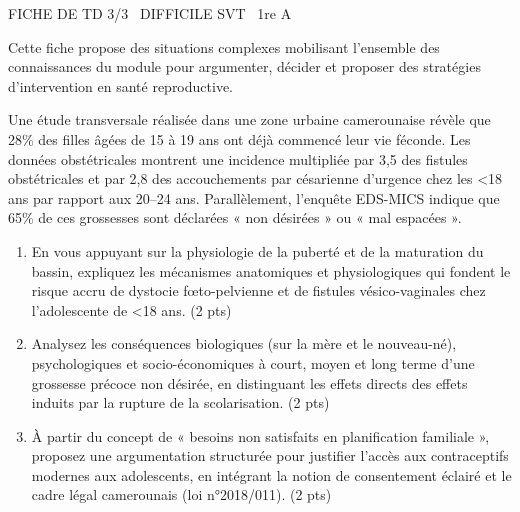 \documentclass[11pt]{article}
\begin{document}
\begin{tcolorbox}[enhanced,colback=popink,colframe=popink,arc=10pt,boxrule=0pt,left=12pt,right=12pt,top=9pt,bottom=9pt]
{\color{white}\popxbold\small FICHE DE TD 3/3 \textbullet\ DIFFICILE \hfill SVT \textbullet\ 1re A\par}
\end{tcolorbox}
\vspace{4pt}
Cette fiche propose des situations complexes mobilisant l'ensemble des connaissances du module pour argumenter, décider et proposer des stratégies d'intervention en santé reproductive.

\begin{exercice}
Une étude transversale réalisée dans une zone urbaine camerounaise révèle que 28\% des filles âgées de 15 à 19 ans ont déjà commencé leur vie féconde. Les données obstétricales montrent une incidence multipliée par 3,5 des fistules obstétricales et par 2,8 des accouchements par césarienne d'urgence chez les \textless 18 ans par rapport aux 20--24 ans. Parallèlement, l'enquête EDS-MICS indique que 65\% de ces grossesses sont déclarées « non désirées » ou « mal espacées ».

\begin{enumerate}
    \item En vous appuyant sur la physiologie de la puberté et de la maturation du bassin, expliquez les mécanismes anatomiques et physiologiques qui fondent le risque accru de dystocie fœto-pelvienne et de fistules vésico-vaginales chez l'adolescente de \textless 18 ans. (2 pts)
    \item Analysez les conséquences biologiques (sur la mère et le nouveau-né), psychologiques et socio-économiques à court, moyen et long terme d'une grossesse précoce non désirée, en distinguant les effets directs des effets induits par la rupture de la scolarisation. (2 pts)
    \item À partir du concept de « besoins non satisfaits en planification familiale », proposez une argumentation structurée pour justifier l'accès aux contraceptifs modernes aux adolescents, en intégrant la notion de consentement éclairé et le cadre légal camerounais (loi n°2018/011). (2 pts)
\end{enumerate}
\end{exercice}
\end{document}
